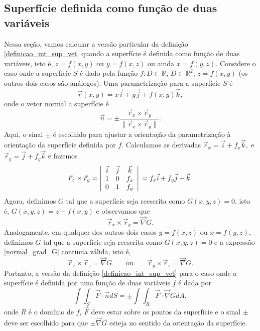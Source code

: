 \subsection{Superfície definida como função de duas variáveis}
Nessa seção, vamos calcular a versão particular da definição \eqref{definicao_int_sup_vet} quando a superfície é definida como função de duas variáveis, isto é, $z=f(x,y)$ ou $y=f(x,z)$ ou ainda $x=f(y,z)$. Considere o caso onde a superfície $S$ é dado pela função $f:D\subset\mathbb{R}$, $D\subset \mathbb{R}^2$, $z=f(x,y)$ (os outros dois casos são análogos). Uma parametrização para a superfície $S$ é
$$
\vec{r}(x,y)= x\vec{i}+ y\vec{j}+ f(x,y)\vec{k},
$$
onde o vetor normal a superfície é
$$
\vec{n}=\pm\frac{\vec{r}_x\times \vec{r}_y}{\|\vec{r}_x\times \vec{r}_y\|}.
$$
Aqui, o sinal $\pm$ é escolhido para ajustar a orientação da parametrização à orientação da superfície definida por $f$. Calculamos as derivadas $\vec{r}_x=\vec{i}+ f_x\vec{k},$ e $\vec{r}_y=\vec{j}+ f_y\vec{k}$ e fazemos
$$
  \vec{r}_x\times\vec{r}_y=\left|
 \begin{array}{ccc}
 \vec{i} & \vec{j} & \vec{k} \\
  1 &0 & f_x \\
0 &  1 & f_y
 \end{array}
\right|\\= f_x\vec{i}+ f_y\vec{j}+\vec{k}.
$$
Agora, definimos $G$ tal que a superfície seja reescrita como $G(x,y,z)=0$, isto é, $G(x,y,z)=z-f(x,y)$ e observamos que
\begin{equation}\label{normal_grad_G}
   \vec{r}_x\times\vec{r}_y=\vec{ \nabla} G.
\end{equation}
Analogamente, em qualquer dos outros dois casos $y=f(x,z)$ ou $x=f(y,z)$, definimos $G$ tal que a superfície seja reescrita como $G(x,y,z)=0$ e a expressão \eqref{normal_grad_G} continua válida, isto é,
\begin{equation*}\label{normal_grad_G_2}
   \vec{r}_x\times\vec{r}_z=\vec{ \nabla} G\qquad \text{ou} \qquad    \vec{r}_y\times\vec{r}_z=\vec{ \nabla} G.
\end{equation*}
Portanto, a versão da definição \eqref{definicao_int_sup_vet} para o caso onde a superfície é definida por uma função de duas variáveis $f$ é dada por
\begin{equation}\label{definicao_int_sup_vet_par}
\int\int_S \vec{F}\cdot \vec{n} d S= \pm \int\int_R \vec{F}\cdot \vec{\nabla}G dA,
\end{equation}
onde $R$ é o domínio de $f$, $\vec{F}$ deve estar sobre os pontos da superfície e o sinal $\pm$ deve ser escolhido para que $\pm \vec{\nabla}G$ esteja no sentido da orientação da superfície.

